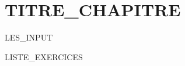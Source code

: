 \documentclass[a4paper,10pt]{book}
\begin{document}


\setcounter{chapter}{N_CHAPITRE}

\chapter{TITRE_CHAPITRE}
LES_INPUT

\newpage

\thispagestyle{empty}

\renewcommand{\thesection}{\arabic{section}}

\renewcommand{\cite}[1]{}           %


LISTE_EXERCICES
\end{document}
